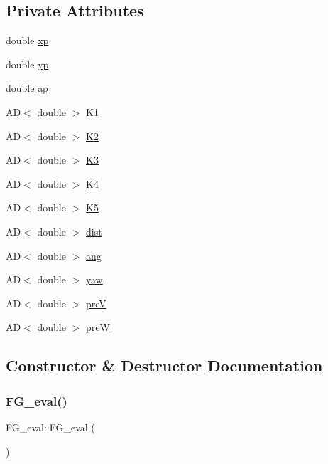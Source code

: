 \subsection*{Private Attributes}
\begin{DoxyCompactItemize}
\item 
double \hyperlink{classFG__eval_ae37d43302e8c2f0768e0903afdc4dec5}{xp}
\item 
double \hyperlink{classFG__eval_a8df0b0ddcb354b68551c11a1788a9b6e}{yp}
\item 
double \hyperlink{classFG__eval_a8cea35a0a3b58c8dc7cc9be19a1e9013}{ap}
\item 
AD$<$ double $>$ \hyperlink{classFG__eval_a5dcf5982e81dceca40b4bc474827b5aa}{K1}
\item 
AD$<$ double $>$ \hyperlink{classFG__eval_af671d3c7db3b17c2a6fda4798b402320}{K2}
\item 
AD$<$ double $>$ \hyperlink{classFG__eval_a6afb8dacd318791bdad27da2649ff618}{K3}
\item 
AD$<$ double $>$ \hyperlink{classFG__eval_a45479bca30dc7f49625d0d05fd17bc7c}{K4}
\item 
AD$<$ double $>$ \hyperlink{classFG__eval_a969e08a07221e37ccce7ec008aea7356}{K5}
\item 
AD$<$ double $>$ \hyperlink{classFG__eval_a679badb474e00e9d169f1bdc24657129}{dist}
\item 
AD$<$ double $>$ \hyperlink{classFG__eval_a9e9644f7d9759e9fc3babf41d658cbf7}{ang}
\item 
AD$<$ double $>$ \hyperlink{classFG__eval_a6ce3987053540554a0287422fb4f5ce2}{yaw}
\item 
AD$<$ double $>$ \hyperlink{classFG__eval_ab24a3bc79de568dd46827959993a7dc6}{preV}
\item 
AD$<$ double $>$ \hyperlink{classFG__eval_a2efce268a9d4e915e8cd6f670bf80217}{preW}
\end{DoxyCompactItemize}


\subsection{Constructor \& Destructor Documentation}
\mbox{\label{classFG__eval_a0a9e41e75d2ab3597a535a73b2a30ede}} 
\subsubsection{\texorpdfstring{F\+G\+\_\+eval()}{FG\_eval()}\hspace{0.1cm}{\footnotesize\ttfamily [1/2]}}
{\footnotesize\ttfamily F\+G\+\_\+eval\+::\+F\+G\+\_\+eval (\begin{DoxyParamCaption}{ }\end{DoxyParamCaption})}

